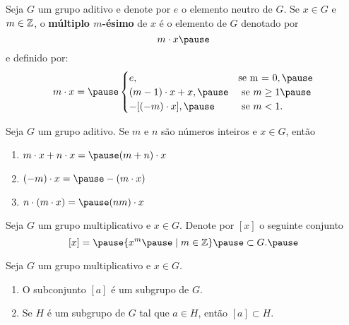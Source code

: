 \documentclass{beamer}
\begin{document}
    \begin{frame}
        Seja $G$ um grupo aditivo \pause e denote por $e$ o elemento neutro de $G$. \pause Se $x \in G$ \pause e $m \in \mathbb{Z}$, \pause o \textbf{múltiplo $m$-ésimo} de $x$ \pause é o elemento de $G$ denotado por \pause
        \[
            m \cdot x \pause
        \]
        e definido por:
        \[
            m \cdot x = \pause \begin{cases}
                    e, & \mbox{se m = 0}, \pause\\
                    (m - 1)\cdot x + x, \pause & \mbox{ se } m \ge 1 \pause\\
                    -[(-m) \cdot x], \pause & \mbox{ se } m < 1. 
                   \end{cases}
        \]
    \end{frame}

    \begin{frame}
        \begin{proposicao}
            Seja $G$ um grupo aditivo. \pause Se $m$ e $n$ são números inteiros \pause e $x \in G$, então \pause
            \begin{enumerate}[label={\arabic*})]
                \item $m \cdot x + n \cdot x = \pause (m + n) \cdot x$ \pause

                \item $(-m) \cdot x = \pause -(m \cdot x)$ \pause

                \item $n\cdot (m \cdot x) = \pause (nm)\cdot x$
            \end{enumerate}
        \end{proposicao}
    \end{frame}

    \begin{frame}
        Seja $G$ um grupo multiplicativo \pause e $x \in G$. \pause Denote por $[x]$ \pause o seguinte conjunto \pause
        \[
            [x] = \pause \{x^m \pause \mid m \in \z\} \pause \subset G.\pause
        \]

        \begin{proposicao}
            Seja $G$ um grupo multiplicativo \pause e $x \in G$. \pause
            \begin{enumerate}[label={\arabic*})]
                \item O subconjunto $[a]$ \pause é um subgrupo de $G$.\pause

                \item Se $H$ é um subgrupo de $G$ \pause tal que $a \in H$, \pause então $[a] \subset H$.\pause
            \end{enumerate}
        \end{proposicao}
    \end{frame}
\end{document}
